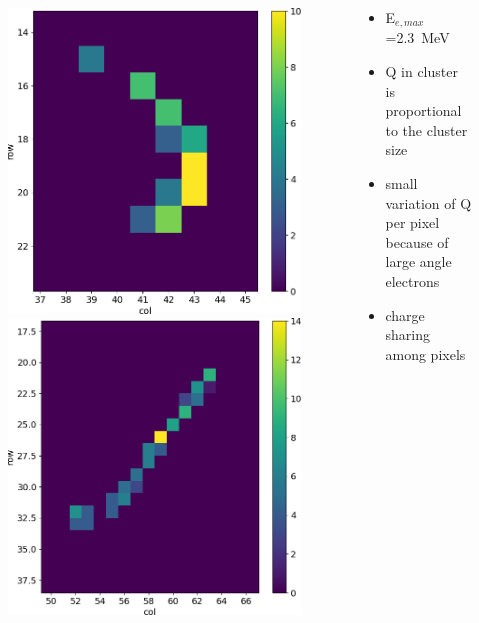 \begin{frame}
\begin{columns}
\begin{figure}
                    \includegraphics[width=.3\linewidth]{figures/charaterization/evts/Sr90/10b.png} 
                    \includegraphics[width=.3\linewidth]{figures/charaterization/evts/Sr90/21a.png}
                \end{figure}
                \begin{itemize}
                    \item E$_{e, max}$=\SI{2.3}{MeV}
                    \item Q in cluster is proportional to the cluster size
                    \item small variation of Q per pixel because of large angle electrons
                    \item charge sharing among pixels 
                \end{itemize}
        \end{columns}
    \end{frame}    


